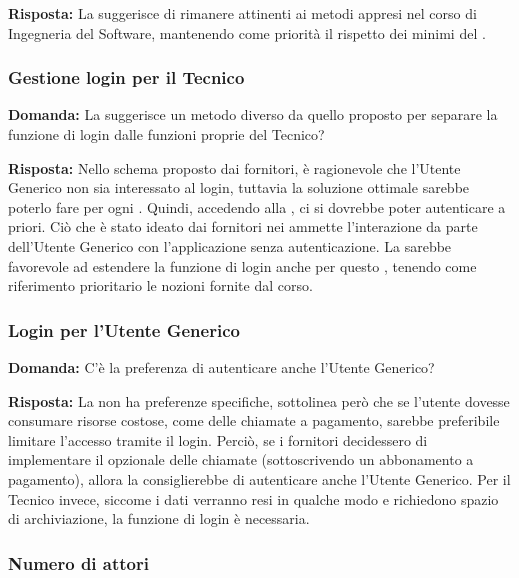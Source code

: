 \textbf{Risposta:} La  suggerisce di rimanere attinenti ai metodi appresi nel corso di Ingegneria del Software, mantenendo come priorità il rispetto dei  minimi del .

\subsubsection{Gestione login per il Tecnico}

\textbf{Domanda:} La  suggerisce un metodo diverso da quello proposto per separare la funzione di login dalle funzioni proprie del Tecnico?

\textbf{Risposta:} Nello schema proposto dai fornitori, è ragionevole che l'Utente Generico non sia interessato al login, tuttavia la soluzione ottimale sarebbe poterlo fare per ogni . Quindi, accedendo alla , ci si dovrebbe poter autenticare a priori.
Ciò che è stato ideato dai fornitori nei  ammette l'interazione da parte dell'Utente Generico con l'applicazione senza autenticazione. La  sarebbe favorevole ad estendere la funzione di login anche per questo , tenendo come riferimento prioritario le nozioni fornite dal corso. 

\subsubsection{Login per l'Utente Generico}

\textbf{Domanda:} C'è la preferenza di autenticare anche l'Utente Generico?

\textbf{Risposta:} La  non ha preferenze specifiche, sottolinea però che se l'utente dovesse consumare risorse costose, come delle chiamate  a pagamento, sarebbe preferibile limitare l'accesso tramite il login. Perciò, se i fornitori decidessero di implementare il  opzionale delle chiamate  (sottoscrivendo un abbonamento a pagamento), allora la  consiglierebbe di autenticare anche l'Utente Generico. Per il Tecnico invece, siccome i dati verranno resi in qualche modo  e richiedono spazio di archiviazione, la funzione di login è necessaria.

\subsubsection{Numero di attori}

